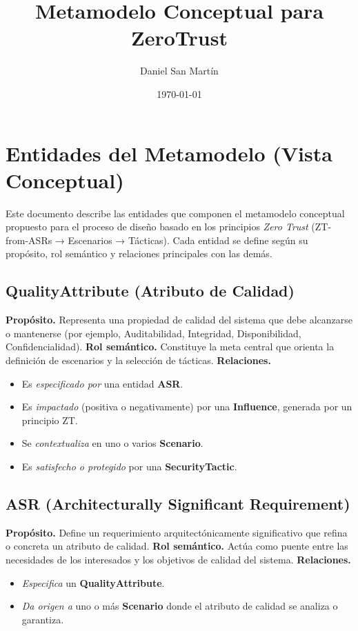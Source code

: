 \documentclass[12pt,letterpaper]{article}
\title{Metamodelo Conceptual para ZeroTrust}
\author{Daniel San Martín}
\date{\today}
\begin{document}
	
	\maketitle
	
	\section{Entidades del Metamodelo (Vista Conceptual)}
	Este documento describe las entidades que componen el metamodelo conceptual propuesto para el proceso de diseño basado en los principios \textit{Zero Trust} (ZT-from-ASRs → Escenarios → Tácticas).  
	Cada entidad se define según su propósito, rol semántico y relaciones principales con las demás.
	
	\subsection{QualityAttribute (Atributo de Calidad)}
	\textbf{Propósito.} Representa una propiedad de calidad del sistema que debe alcanzarse o mantenerse (por ejemplo, Auditabilidad, Integridad, Disponibilidad, Confidencialidad).  
	\textbf{Rol semántico.} Constituye la meta central que orienta la definición de escenarios y la selección de tácticas.  
	\textbf{Relaciones.}
	\begin{itemize}[noitemsep]
		\item Es \emph{especificado por} una entidad \textbf{ASR}.
		\item Es \emph{impactado} (positiva o negativamente) por una \textbf{Influence}, generada por un principio ZT.
		\item Se \emph{contextualiza} en uno o varios \textbf{Scenario}.
		\item Es \emph{satisfecho o protegido} por una \textbf{SecurityTactic}.
	\end{itemize}
	
	\subsection{ASR (Architecturally Significant Requirement)}
	\textbf{Propósito.} Define un requerimiento arquitectónicamente significativo que refina o concreta un atributo de calidad.  
	\textbf{Rol semántico.} Actúa como puente entre las necesidades de los interesados y los objetivos de calidad del sistema.  
	\textbf{Relaciones.}
	\begin{itemize}[noitemsep]
		\item \emph{Especifica} un \textbf{QualityAttribute}.
		\item \emph{Da origen a} uno o más \textbf{Scenario} donde el atributo de calidad se analiza o garantiza.
	\end{itemize}
	
\end{document}
